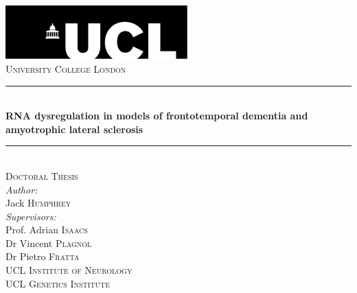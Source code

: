 
\begin{titlepage}%
\newcommand{\HRule}{\rule{\linewidth}{0.5mm}}

\center 

\includegraphics[width=7cm]{Figures/misc/ucllogo.jpg}\\[1cm]
\textsc{\LARGE University College London}\\[2cm] %
\HRule \\[1cm]
{ \huge \bfseries RNA dysregulation in models of frontotemporal dementia and amyotrophic lateral sclerosis}\\[0.4cm] 
\HRule \\[1.5cm]


\textsc{\Large Doctoral Thesis}\\[1.5cm] %


\emph{Author:}\\
Jack \textsc{Humphrey}\\[1cm] %

\emph{Supervisors:} \\
Prof. Adrian \textsc{Isaacs}\\ 
Dr Vincent \textsc{Plagnol}\\ 
Dr Pietro \textsc{Fratta}\\[1cm]


\textsc{\Large UCL Institute of Neurology}\\[0.5cm] %
\textsc{\Large UCL Genetics Institute}\\[2cm] %




\vfill %

\end{titlepage}%
\cleardoublepage

